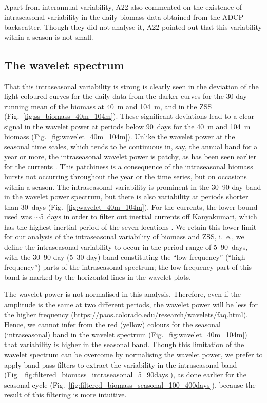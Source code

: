 \documentclass[authoryear,review,11pt]{elsarticle}
\begin{document}
Apart from interannual variability, A22 also commented on the existence of intraseasonal variability in the daily biomass data obtained from the ADCP backscatter. Though they did not analyse it, A22 pointed out that this variability within a season is not small.

\subsection{The wavelet spectrum}
\label{sec:intraseasonal.wavelet}

That this intraseasonal variability is strong is clearly seen in the deviation of the light-coloured curves for the daily data from the darker curves for the 30-day running mean of the biomass at 40~m and 104~m, and in the ZSS (Fig.~\ref{fig:ss_biomass_40m_104m}).  These significant deviations lead to a clear signal in the wavelet power at periods below 90~days for the 40~m and 104~m biomass (Fig.~\ref{fig:wavelet_40m_104m}).  Unlike the wavelet power at the seasonal time scales, which tends to be continuous in, say, the annual band for a year or more, the intraseasonal wavelet power is patchy, as has been seen earlier for the currents \citep{amol2014observed, mukherjee2014observed, chaudhuri2020observed, mukhopadhyay2020observed}. This patchiness is a consequence of the intraseasonal biomass bursts not occurring throughout the year or the time series, but on occasions within a season.  The intraseasonal variability is prominent in the 30--90-day band in the wavelet power spectrum, but there is also variability at periods shorter than 30~days (Fig.~\ref{fig:wavelet_40m_104m}). For the currents, the lower bound used was $\sim$5~days in order to filter out inertial currents off Kanyakumari, which has the highest inertial period of the seven locations \citep{amol2014observed, chaudhuri2020observed}.  We retain this lower limit for our analysis of the intraseasonal variability of biomass and ZSS, i.~e., we define the intraseasonal variability to occur in the period range of 5--90~days, with the 30--90-day (5--30-day) band constituting the ``low-frequency'' (``high-frequency'') parts of the intraseasonal spectrum; the low-frequency part of this band is marked by the horizontal lines in the wavelet plots.

The wavelet power is not normalised in this analysis.  Therefore, even if the amplitude is the same at two different periods, the wavelet power will be less for the higher frequency (\url{https://paos.colorado.edu/research/wavelets/faq.html}). Hence, we cannot infer from the red (yellow) colours for the seasonal (intraseasonal) band in the wavelet spectrum (Fig.~\ref{fig:wavelet_40m_104m}) that variability is higher in the seasonal band. Though this limitation of the wavelet spectrum can be overcome by normalising the wavelet power, we prefer to apply band-pass filters to extract the variability in the intraseasonal band (Fig.~\ref{fig:filtered_biomass_intraseasonal_5_90days}), as done earlier for the seasonal cycle (Fig.~\ref{fig:filtered_biomass_seasonal_100_400days}), because the result of this filtering is more intuitive. 
\end{document}

